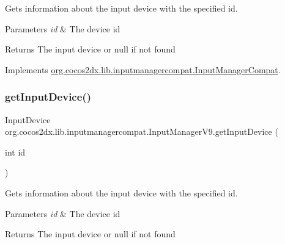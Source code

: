Gets information about the input device with the specified id.


\begin{DoxyParams}{Parameters}
{\em id} & The device id \\
\hline
\end{DoxyParams}
\begin{DoxyReturn}{Returns}
The input device or null if not found 
\end{DoxyReturn}


Implements \hyperlink{interfaceorg_1_1cocos2dx_1_1lib_1_1inputmanagercompat_1_1InputManagerCompat_afbfb5229b12433c81ddbf9e0315cd986}{org.\+cocos2dx.\+lib.\+inputmanagercompat.\+Input\+Manager\+Compat}.

\mbox{\label{classorg_1_1cocos2dx_1_1lib_1_1inputmanagercompat_1_1InputManagerV9_a86e8c5b196c4f0707dccc1d0f6b1d0dd}} 
\subsubsection{\texorpdfstring{get\+Input\+Device()}{getInputDevice()}\hspace{0.1cm}{\footnotesize\ttfamily [2/2]}}
{\footnotesize\ttfamily Input\+Device org.\+cocos2dx.\+lib.\+inputmanagercompat.\+Input\+Manager\+V9.\+get\+Input\+Device (\begin{DoxyParamCaption}\item[{int}]{id }\end{DoxyParamCaption})\hspace{0.3cm}{\ttfamily [inline]}}

Gets information about the input device with the specified id.


\begin{DoxyParams}{Parameters}
{\em id} & The device id \\
\hline
\end{DoxyParams}
\begin{DoxyReturn}{Returns}
The input device or null if not found 
\end{DoxyReturn}


